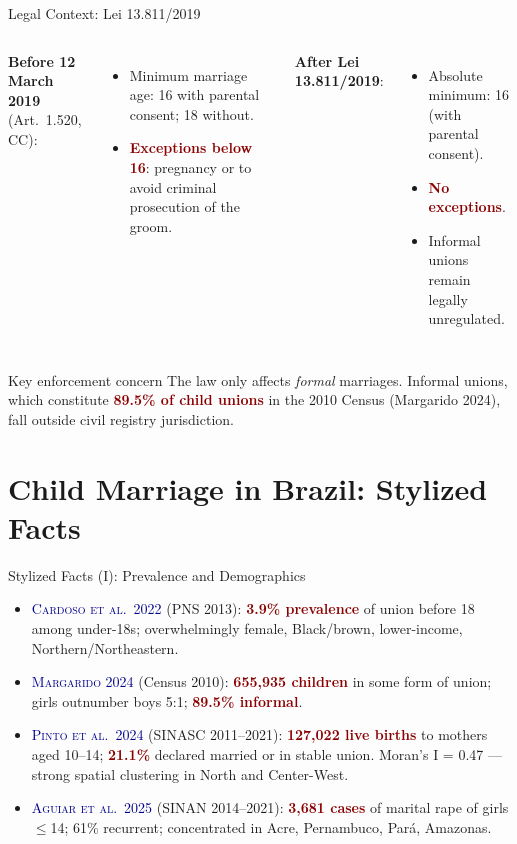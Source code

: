 \documentclass[aspectratio=169,10pt]{beamer}
\newcommand{\onecite}[1]{\textcolor{darkblue}{\textsc{#1}}}
\newcommand{\hl}[1]{\textcolor{darkred}{\textbf{#1}}}
\begin{document}
\begin{frame}{Legal Context: Lei 13.811/2019}
    \begin{columns}[T]
        \textbf{Before 12 March 2019} (Art.~1.520, CC):
        \begin{itemize}
            \item Minimum marriage age: 16 with parental consent; 18 without.
            \item \hl{Exceptions below 16}: pregnancy or to avoid criminal prosecution of the groom.
        \end{itemize}

        \textbf{After Lei 13.811/2019}:
        \begin{itemize}
            \item Absolute minimum: 16 (with parental consent).
            \item \hl{No exceptions}.
            \item Informal unions remain legally unregulated.
        \end{itemize}
    \end{columns}

    \vspace{0.4cm}
    \begin{alertblock}{Key enforcement concern}
        The law only affects \textit{formal} marriages. Informal unions, which constitute \hl{89.5\% of child unions} in the 2010 Census (Margarido 2024), fall outside civil registry jurisdiction.
    \end{alertblock}
\end{frame}

\section{Child Marriage in Brazil: Stylized Facts}

\begin{frame}{Stylized Facts (I): Prevalence and Demographics}
    \begin{itemize}
        \item \onecite{Cardoso et al.\ 2022} (PNS 2013): \hl{3.9\% prevalence} of union before 18 among under-18s; overwhelmingly female, Black/brown, lower-income, Northern/Northeastern.
        \item \onecite{Margarido 2024} (Census 2010): \hl{655{,}935 children} in some form of union; girls outnumber boys 5:1; \hl{89.5\% informal}.
        \item \onecite{Pinto et al.\ 2024} (SINASC 2011--2021): \hl{127{,}022 live births} to mothers aged 10--14; \hl{21.1\%} declared married or in stable union. Moran's I = 0.47 --- strong spatial clustering in North and Center-West.
        \item \onecite{Aguiar et al.\ 2025} (SINAN 2014--2021): \hl{3{,}681 cases} of marital rape of girls $\leq$14; 61\% recurrent; concentrated in Acre, Pernambuco, Par\'a, Amazonas.
    \end{itemize}
\end{frame}
\end{document}
